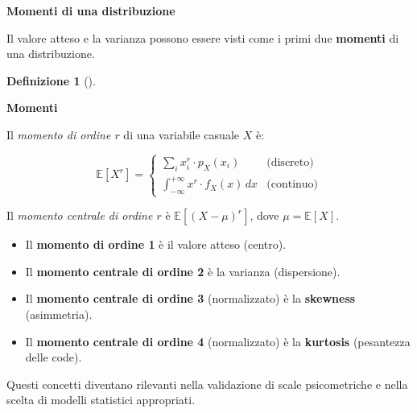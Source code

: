 \documentclass[
  italian,
  letterpaper,
  a4paper,
  11pt,
  open=any]{scrbook}
\providecommand{\tightlist}{%
  \setlength{\itemsep}{0pt}\setlength{\parskip}{0pt}}
\theoremstyle{plain}
\theoremstyle{definition}
\theoremstyle{definition}
\newtheorem{definition}{Definizione}[chapter]
\theoremstyle{remark}
\begin{document}
\begin{tcolorbox}[enhanced jigsaw, arc=.35mm, bottomrule=.15mm, bottomtitle=1mm, breakable, colback=white, colbacktitle=quarto-callout-note-color!10!white, colframe=quarto-callout-note-color-frame, coltitle=black, left=2mm, leftrule=.75mm, opacityback=0, opacitybacktitle=0.6, rightrule=.15mm, title=\textcolor{quarto-callout-note-color}{\faInfo}\hspace{0.5em}{Approfondimento: i momenti di una distribuzione}, titlerule=0mm, toprule=.15mm, toptitle=1mm]

\textbf{Momenti di una distribuzione}

Il valore atteso e la varianza possono essere visti come i primi due
\textbf{momenti} di una distribuzione.

\begin{definition}[]\protect\hypertarget{def-moments}{}\label{def-moments}

\textbf{Momenti}

Il \emph{momento di ordine \(r\)} di una variabile casuale \(X\) è:

\[
\mathbb{E}[X^r] =
\begin{cases}
\sum_i x_i^r \cdot p_X(x_i) & \text{(discreto)} \\
\int_{-\infty}^{+\infty} x^r \cdot f_X(x)\,dx & \text{(continuo)}
\end{cases}
\]

Il \emph{momento centrale di ordine \(r\)} è
\(\mathbb{E}[(X - \mu)^r]\), dove \(\mu = \mathbb{E}[X]\).

\end{definition}

\begin{itemize}
\tightlist
\item
  Il \textbf{momento di ordine 1} è il valore atteso (centro).
\item
  Il \textbf{momento centrale di ordine 2} è la varianza (dispersione).
\item
  Il \textbf{momento centrale di ordine 3} (normalizzato) è la
  \textbf{skewness} (asimmetria).
\item
  Il \textbf{momento centrale di ordine 4} (normalizzato) è la
  \textbf{kurtosis} (pesantezza delle code).
\end{itemize}

Questi concetti diventano rilevanti nella validazione di scale
psicometriche e nella scelta di modelli statistici appropriati.

\end{tcolorbox}
\end{document}
